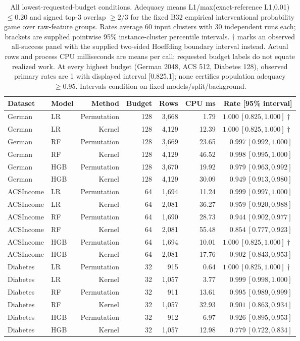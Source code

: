 \begin{table}[tb]
\centering
\caption{All lowest-requested-budget conditions. Adequacy means L1/max(exact-reference L1,0.01) $\leq0.20$ and signed top-3 overlap $\geq2/3$ for the fixed B32 empirical interventional probability game over raw-feature groups. Rates average 60 input clusters with 30 independent runs each; brackets are supplied pointwise 95\% instance-cluster percentile intervals. $\dagger$ marks an observed all-success panel with the supplied two-sided Hoeffding boundary interval instead. Actual rows and process CPU milliseconds are means per call; requested budget labels do not equate realized work. At every highest budget (German 2048, ACS 512, Diabetes 128), observed primary rates are 1 with displayed interval [0.825,1]; none certifies population adequacy $\geq0.95$. Intervals condition on fixed models/split/background.}
\label{tab:primary-rates}
\small
\begin{tabular}{llrrrrr}
\toprule
Dataset & Model & Method & Budget & Rows & CPU ms & Rate [95\% interval] \\
\midrule
German & LR & Permutation & 128 & 3,668 & 1.79 & $1.000\ [0.825,1.000]\dagger$ \\
German & LR & Kernel & 128 & 4,129 & 12.39 & $1.000\ [0.825,1.000]\dagger$ \\
German & RF & Permutation & 128 & 3,669 & 23.65 & $0.997\ [0.992,1.000]$ \\
German & RF & Kernel & 128 & 4,129 & 46.52 & $0.998\ [0.995,1.000]$ \\
German & HGB & Permutation & 128 & 3,670 & 19.92 & $0.979\ [0.963,0.992]$ \\
German & HGB & Kernel & 128 & 4,129 & 30.09 & $0.949\ [0.913,0.980]$ \\
ACSIncome & LR & Permutation & 64 & 1,694 & 11.24 & $0.999\ [0.997,1.000]$ \\
ACSIncome & LR & Kernel & 64 & 2,081 & 36.27 & $0.959\ [0.920,0.988]$ \\
ACSIncome & RF & Permutation & 64 & 1,690 & 28.73 & $0.944\ [0.902,0.977]$ \\
ACSIncome & RF & Kernel & 64 & 2,081 & 55.48 & $0.854\ [0.777,0.923]$ \\
ACSIncome & HGB & Permutation & 64 & 1,694 & 10.01 & $1.000\ [0.825,1.000]\dagger$ \\
ACSIncome & HGB & Kernel & 64 & 2,081 & 17.76 & $0.902\ [0.843,0.953]$ \\
Diabetes & LR & Permutation & 32 & 915 & 0.64 & $1.000\ [0.825,1.000]\dagger$ \\
Diabetes & LR & Kernel & 32 & 1,057 & 3.77 & $0.999\ [0.998,1.000]$ \\
Diabetes & RF & Permutation & 32 & 911 & 13.61 & $0.995\ [0.989,0.999]$ \\
Diabetes & RF & Kernel & 32 & 1,057 & 32.93 & $0.901\ [0.863,0.934]$ \\
Diabetes & HGB & Permutation & 32 & 912 & 6.97 & $0.926\ [0.895,0.953]$ \\
Diabetes & HGB & Kernel & 32 & 1,057 & 12.98 & $0.779\ [0.722,0.834]$ \\
\bottomrule
\end{tabular}
\end{table}
